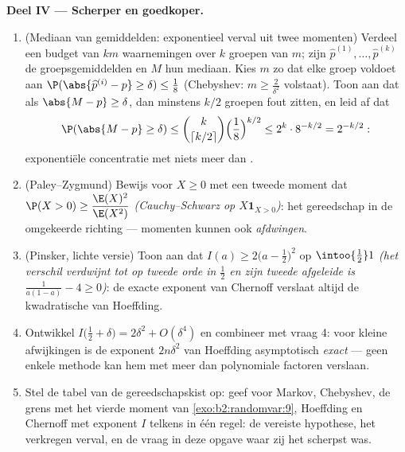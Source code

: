 \begin{problem}
\medskip
\noindent\textbf{Deel IV --- Scherper en goedkoper.}
\begin{enumerate}[resume]
  \item (Mediaan van gemiddelden: exponentieel verval uit twee
        momenten) Verdeel een budget van $km$ waarnemingen over $k$
         groepen van $m$; zijn $\widehat p^{(1)},
        \dots, \widehat p^{(k)}$ de groepsgemiddelden en $M$ hun
        mediaan. Kies $m$ zo dat elke groep voldoet aan
        $\P(\abs{\widehat p^{(i)} - p} \geq \delta) \leq \frac18$
        (Chebyshev: $m \geq \frac2{\delta^2}$ volstaat). Toon aan
        dat als $\abs{M - p} \geq \delta$, dan minstens $k/2$
        groepen fout zitten, en leid af dat
        \[
        \P(\abs{M - p} \geq \delta)
        \leq \binom{k}{\lceil k/2\rceil}\Bigl(\frac18
        \Bigr)^{k/2}
        \leq 2^k\cdot 8^{-k/2} = 2^{-k/2} :
        \]
        exponentiële concentratie met niets meer dan .
  \item (Paley--Zygmund) Bewijs voor $X \geq 0$ met een tweede
        moment dat $\P(X > 0) \geq \dfrac{\E(X)^2}{\E(X^2)}$
        \emph{(Cauchy--Schwarz op $X\mathbf 1_{X>0}$)}: het
        gereedschap in de omgekeerde richting --- momenten kunnen
         ook \emph{afdwingen}.
  \item (Pinsker, lichte versie) Toon aan dat $I(a) \geq 2\bigl(a -
        \tfrac12\bigr)^2$ op $\intoo{\frac12}1$ \emph{(het verschil
        verdwijnt tot op tweede orde in $\frac12$ en zijn tweede
        afgeleide is $\frac1{a(1-a)} - 4 \geq 0$)}: de exacte
        exponent van Chernoff verslaat altijd de kwadratische van
        Hoeffding.
  \item Ontwikkel $I\bigl(\tfrac12 + \delta\bigr) = 2\delta^2 +
        O(\delta^4)$ en combineer met vraag 4: voor kleine
        afwijkingen is de exponent $2n\delta^2$ van Hoeffding
        asymptotisch \emph{exact} --- geen enkele methode kan hem
        met meer dan polynomiale factoren verslaan.
  \item Stel de tabel van de gereedschapskist op: geef voor Markov,
        Chebyshev, de grens met het vierde moment van
        \cref{exo:b2:randomvar:9}, Hoeffding en Chernoff met
        exponent $I$ telkens in één regel: de vereiste hypothese,
        het verkregen verval, en de vraag in deze opgave waar zij
        het scherpst was.
\end{enumerate}


\end{problem}
